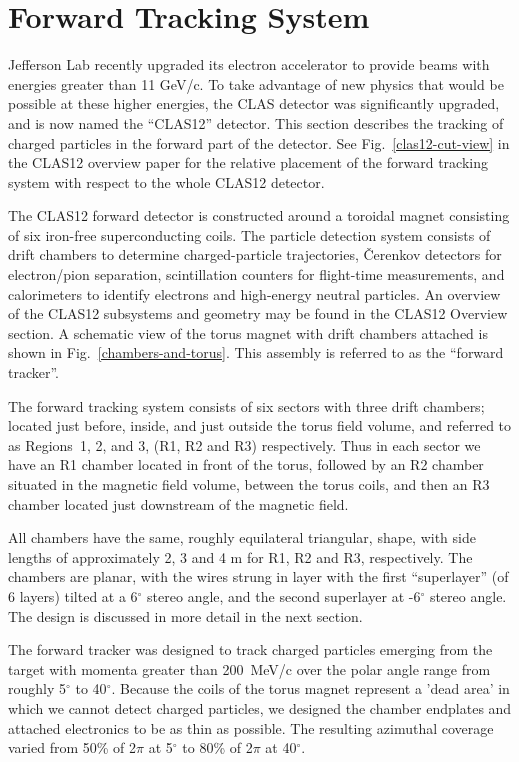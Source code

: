 \section{Forward Tracking System}
\label{overview}

Jefferson Lab recently upgraded its electron accelerator to provide beams with 
energies greater than 11 GeV/c.  To take advantage of new physics that would 
be possible at these higher energies, the CLAS detector was significantly
upgraded, and is now named the ``CLAS12'' detector.  This section describes
the tracking of charged particles in the forward part of the detector.
See Fig.~\ref{clas12-cut-view} in the CLAS12 overview paper for the relative placement
of the forward tracking system with respect to the whole CLAS12 detector.


The CLAS12 forward detector is constructed around a toroidal magnet consisting of six 
iron-free superconducting coils.  The particle detection system consists of drift 
chambers to determine charged-particle trajectories, {\v C}erenkov detectors 
for electron/pion separation, scintillation counters for flight-time 
measurements, and calorimeters to identify electrons and high-energy neutral 
particles.  An overview of the CLAS12 subsystems and geometry may be found in the 
CLAS12 Overview section.  A schematic view of the torus magnet with drift chambers
attached is shown in Fig.~\ref{chambers-and-torus}.   This assembly is referred to
as the ``forward tracker''. 

The forward tracking system consists of six sectors with three drift
chambers; located just before, inside, 
and just outside the torus field volume, and referred to as Regions~1, 2, 
and 3, (R1, R2 and R3) respectively.  Thus in each sector we have an R1 chamber located
in front of the torus, followed by an R2 chamber situated in the magnetic
field volume, between the torus coils, and then an R3 chamber located just
downstream of the magnetic field.

All chambers have the same, roughly equilateral triangular, shape, with
side lengths of approximately 2, 3 and 4 m for R1, R2 and R3, respectively.
The chambers are planar, with the wires strung in layer with the first 
``superlayer'' (of 6 layers)
tilted at a 6$^\circ$ stereo angle, and the second superlayer at -6$^\circ$ stereo
angle.  The design is discussed in more detail in the next section.

The forward tracker was designed to track charged particles emerging from the target with
momenta greater than 200~MeV/c over the polar angle range from roughly 5$^{\circ}$ to 
40$^{\circ}$.  Because the coils of the torus magnet represent a 'dead area'
in which we cannot detect charged particles, we designed the chamber endplates
and attached electronics to be as thin as possible.  The resulting azimuthal
coverage varied from 50\% of 2$\pi$ at 5$^{\circ}$ to 80\% of 2$\pi$ at 40$^{\circ}$.


